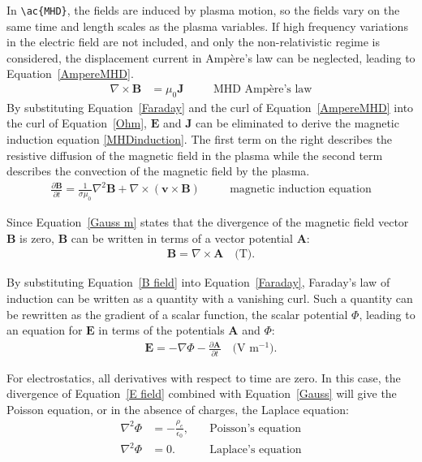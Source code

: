 In \verb!\ac{MHD}!, the fields are induced by plasma motion, so the fields vary on the same time and length scales as the plasma variables. If high frequency variations in the electric field are not included, and only the non-relativistic regime is considered, the displacement current in Amp\`{e}re's law can be neglected, leading to Equation~\ref{AmpereMHD}.
\begin{align}
 \nabla\times\mathbf{B}&=\mu_0\mathbf{J}&&\quad\text{MHD Amp\`{e}re's law}
 \label{AmpereMHD}
\end{align}
\indent By substituting Equation~\ref{Faraday} and the curl of Equation~\ref{AmpereMHD} into the curl of Equation~\ref{Ohm}, $\mathbf{E}$ and $\mathbf{J}$ can be eliminated to derive the magnetic induction equation \eqref{MHDinduction}. The first term on the right describes the resistive diffusion of the magnetic field in the plasma while the second term describes the convection of the magnetic field by the plasma.
\begin{align}
 \frac{\partial\mathbf{B}}{\partial t}=\frac{1}{\sigma\mu_0}\nabla^2\mathbf{B}+\nabla\times\left(\mathbf{v}\times\mathbf{B}\right)&&\quad\text{magnetic induction equation}
 \label{MHDinduction}
\end{align}

Since Equation~\ref{Gauss m} states that the divergence of the magnetic field vector $\mathbf{B}$ is zero, $\mathbf{B}$ can be written in terms of a vector potential $\mathbf{A}$:
\begin{align}
 \mathbf{B}=\nabla\times\mathbf{A}\quad\text{(T)}.
 \label{B field}
\end{align}

By substituting Equation~\ref{B field} into Equation~\ref{Faraday}, Faraday's law of induction can be written as a quantity with a vanishing curl. Such a quantity can be rewritten as the gradient of a scalar function, the scalar potential $\Phi$, leading to an equation for $\mathbf{E}$ in terms of the potentials $\mathbf{A}$ and $\Phi$:
\begin{align}
 \mathbf{E}=-\nabla\Phi-\frac{\partial\mathbf{A}}{\partial t}\quad\text{(V m$^{-1}$)}.
 \label{E field}
\end{align}

For electrostatics, all derivatives with respect to time are zero. In this case, the divergence of Equation~\ref{E field} combined with Equation~\ref{Gauss} will give the Poisson equation, or in the absence of charges, the Laplace equation:
\begin{align}
 \nabla^2\Phi &= -\frac{\rho_e}{\epsilon_0},&\quad\text{Poisson's equation}
 \label{Poisson}\\
 \nabla^2\Phi &= 0.&\quad\text{Laplace's equation}
 \label{Laplace}
\end{align}

